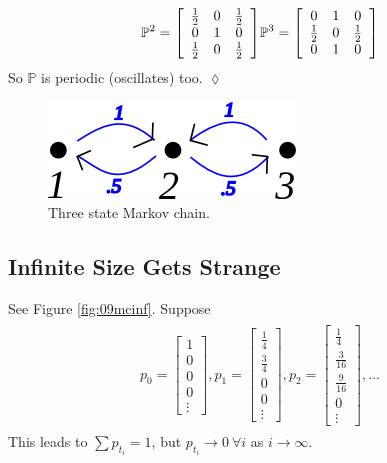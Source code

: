 \documentclass[lecture,12pt,]{pcms-l}
\begin{document}
\begin{example}
\begin{align*}
\begin{split}
\mathbb{P}^2 = \left[\begin{array}{c c c} \frac{1}{2} & 0 & \frac{1}{2} \\ 0 & 1 & 0 \\ \frac{1}{2} & 0 & \frac{1}{2} \end{array}\right]
\end{split}
\begin{split}
\mathbb{P}^3 = \left[\begin{array}{c c c} 0 & 1 & 0 \\ \frac{1}{2} & 0 & \frac{1}{2} \\ 0 & 1 & 0 \end{array}\right]
\end{split}
\end{align*}
So $\mathbb{P}$ is periodic (oscillates) too.
$\lozenge$
\end{example}

\begin{figure}[ht!]
	\centering
	\includegraphics[width=.4\textwidth]{images/09mc3}
	\caption{Three state Markov chain.}
	\label{fig:09mc3}
\end{figure}

\subsection{Infinite Size Gets Strange}
See Figure \ref{fig:09mcinf}. Suppose
\begin{align*}
\begin{split}
p_0 = \left[\begin{array}{c} 1 \\ 0 \\ 0 \\ 0 \\ \vdots \end{array}\right],
p_1 = \left[\begin{array}{c} \frac{1}{4} \\ \frac{3}{4} \\ 0 \\ 0 \\ \vdots \end{array}\right],
p_2 = \left[\begin{array}{c} \frac{1}{4} \\ \frac{3}{16} \\ \frac{9}{16} \\ 0 \\ \vdots \end{array}\right],
\ldots
\end{split}
\end{align*}
This leads to $\sum p_{t_i}=1$, but $p_{t_i}\rightarrow 0 ~\forall i$ as $i\to\infty$.
\end{document}
